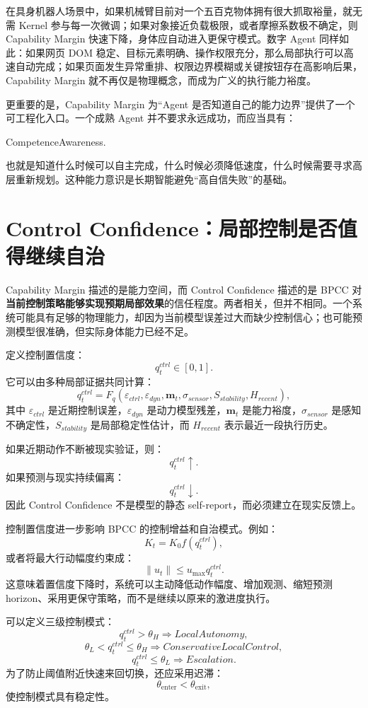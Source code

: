 在具身机器人场景中，如果机械臂目前对一个五百克物体拥有很大抓取裕量，就无需 Kernel 参与每一次微调；如果对象接近负载极限，或者摩擦系数极不确定，则 Capability Margin 快速下降，身体应自动进入更保守模式。数字 Agent 同样如此：如果网页 DOM 稳定、目标元素明确、操作权限充分，那么局部执行可以高速自动完成；如果页面发生异常重排、权限边界模糊或关键按钮存在高影响后果，Capability Margin 就不再仅是物理概念，而成为广义的执行能力裕度。

更重要的是，Capability Margin 为“Agent 是否知道自己的能力边界”提供了一个可工程化入口。一个成熟 Agent 并不要求永远成功，而应当具有：
\begin{statementbox}
CompetenceAwareness.
\end{statementbox}
也就是知道什么时候可以自主完成，什么时候必须降低速度，什么时候需要寻求高层重新规划。这种能力意识是长期智能避免“高自信失败”的基础。

\section{Control Confidence：局部控制是否值得继续自治}

Capability Margin 描述的是能力空间，而 Control Confidence 描述的是 BPCC 对\textbf{当前控制策略能够实现预期局部效果}的信任程度。两者相关，但并不相同。一个系统可能具有足够的物理能力，却因为当前模型误差过大而缺少控制信心；也可能预测模型很准确，但实际身体能力已经不足。

定义控制置信度：
\[
q_t^{ctrl}\in[0,1].
\]
它可以由多种局部证据共同计算：
\[
q_t^{ctrl}
=
F_q
\left(
\varepsilon_{ctrl},
\varepsilon_{dyn},
\mathbf m_t,
\sigma_{sensor},
S_{stability},
H_{recent}
\right),
\]
其中 $\varepsilon_{ctrl}$ 是近期控制误差，$\varepsilon_{dyn}$ 是动力模型残差，$\mathbf m_t$ 是能力裕度，$\sigma_{sensor}$ 是感知不确定性，$S_{stability}$ 是局部稳定性估计，而 $H_{recent}$ 表示最近一段执行历史。

如果近期动作不断被现实验证，则：
\[
q_t^{ctrl}\uparrow.
\]
如果预测与现实持续偏离：
\[
q_t^{ctrl}\downarrow.
\]
因此 Control Confidence 不是模型的静态 self-report，而必须建立在现实反馈上。

控制置信度进一步影响 BPCC 的控制增益和自治模式。例如：
\[
K_t
=
K_0
f(q_t^{ctrl}),
\]
或者将最大行动幅度约束成：
\[
\|u_t\|
\leq
u_{\max}
q_t^{ctrl}.
\]
这意味着置信度下降时，系统可以主动降低动作幅度、增加观测、缩短预测 horizon、采用更保守策略，而不是继续以原来的激进度执行。

可以定义三级控制模式：
\[
q_t^{ctrl}>\theta_H
\Rightarrow
LocalAutonomy,
\]
\[
\theta_L<q_t^{ctrl}\leq\theta_H
\Rightarrow
ConservativeLocalControl,
\]
\[
q_t^{ctrl}\leq\theta_L
\Rightarrow
Escalation.
\]
为了防止阈值附近快速来回切换，还应采用迟滞：
\[
\theta_{\mathrm{enter}}
<
\theta_{\mathrm{exit}},
\]
使控制模式具有稳定性。

